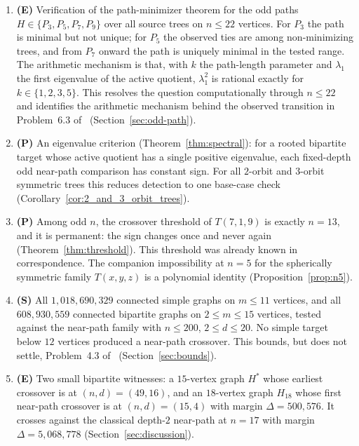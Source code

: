 \begin{enumerate}[label=(\roman*)]
  \item \textbf{(E)} Verification of the path-minimizer theorem for the
    odd paths $H \in \{P_3,P_5,P_7,P_9\}$ over all source trees on
    $n \le 22$ vertices. For $P_3$ the path is minimal but not unique;
    for $P_5$ the observed ties are among non-minimizing trees, and
    from $P_7$ onward the path is uniquely minimal in the tested range.
    The
    arithmetic mechanism is that, with $k$ the path-length parameter
    and $\lambda_1$ the first eigenvalue of the active quotient,
    $\lambda_1^2$ is rational exactly for
    $k \in \{1,2,3,5\}$. This resolves the question computationally
    through $n \le 22$ and identifies the arithmetic mechanism behind
    the observed transition in Problem~6.3 of~\cite{galvin2026}
    (Section~\ref{sec:odd-path}).
  \item \textbf{(P)} An eigenvalue criterion (Theorem~\ref{thm:spectral}):
    for a rooted bipartite target whose active quotient has a single
    positive eigenvalue, each fixed-depth odd near-path comparison has
    constant sign. For all $2$-orbit and $3$-orbit symmetric trees this
    reduces detection to one base-case check
    (Corollary~\ref{cor:2_and_3_orbit_trees}).
  \item \textbf{(P)} Among odd $n$, the crossover threshold of
    $T(7,1,9)$ is exactly $n = 13$, and it is permanent: the sign changes
    once and never again (Theorem~\ref{thm:threshold}). This threshold was already
    known in correspondence. The companion impossibility at $n = 5$ for
    the spherically symmetric family $T(x,y,z)$ is a polynomial
    identity (Proposition~\ref{prop:n5}).
  \item \textbf{(S)} All $1{,}018{,}690{,}329$ connected simple graphs on
    $m \le 11$ vertices, and all $608{,}930{,}559$ connected bipartite
    graphs on $2 \le m \le 15$ vertices, tested against the near-path family
    with $n \le 200$, $2 \le d \le 20$. No simple target below $12$ vertices
    produced a near-path crossover. This bounds, but does not settle,
    Problem~4.3 of~\cite{galvin2025} (Section~\ref{sec:bounds}).
  \item \textbf{(E)} Two small bipartite witnesses: a $15$-vertex graph
    $H^*$ whose earliest crossover is at $(n,d) = (49,16)$, and an
    $18$-vertex graph $H_{18}$ whose first near-path crossover is at
    $(n,d)=(15,4)$ with margin $\Delta=500{,}576$. It crosses against
    the classical depth-$2$ near-path at $n=17$ with margin
    $\Delta = 5{,}068{,}778$ (Section~\ref{sec:discussion}).

\end{enumerate}
